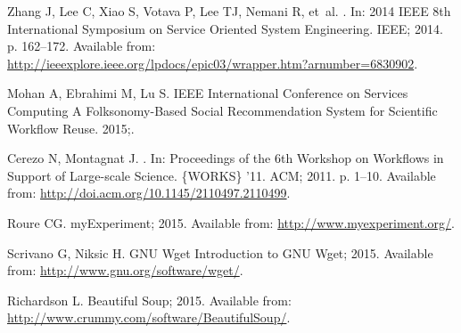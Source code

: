 \documentclass[10pt,letterpaper]{article}
\begin{document}
\begin{thebibliography}{10}
		Zhang J, Lee C, Xiao S, Votava P, Lee TJ, Nemani R, et~al.
		.
		\newblock In: 2014 IEEE 8th International Symposium on Service Oriented System
		Engineering. IEEE; 2014. p. 162--172.
		\newblock Available from:
		\url{http://ieeexplore.ieee.org/lpdocs/epic03/wrapper.htm?arnumber=6830902}.
		
		Mohan A, Ebrahimi M, Lu S.
		 IEEE International Conference on Services Computing A
		Folksonomy-Based Social Recommendation System for Scientific Workflow Reuse.
		2015;.
		
		Cerezo N, Montagnat J.
		.
		\newblock In: Proceedings of the 6th Workshop on Workflows in Support of
		Large-scale Science. \{WORKS\} '11. ACM; 2011. p. 1--10.
		\newblock Available from: \url{http://doi.acm.org/10.1145/2110497.2110499}.
		
		Roure CG. myExperiment; 2015.
		\newblock Available from: \url{http://www.myexperiment.org/}.
		
		Scrivano G, Niksic H. GNU Wget Introduction to GNU Wget; 2015.
		\newblock Available from: \url{http://www.gnu.org/software/wget/}.
		
		Richardson L. Beautiful Soup; 2015.
		\newblock Available from: \url{http://www.crummy.com/software/BeautifulSoup/}.
		
	\end{thebibliography}
\end{document}
